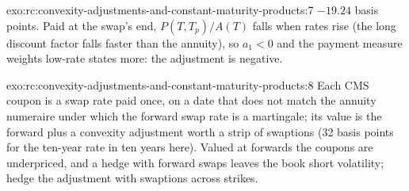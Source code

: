 \begin{solution}{exo:rc:convexity-adjustments-and-constant-maturity-products:7}
$-19.24$ basis points. Paid at the swap's end, $P(T,T_p)/A(T)$ falls when rates
rise (the long discount factor falls faster than the annuity), so $a_1<0$ and
the payment measure weights low-rate states more: the adjustment is negative.
\end{solution}

\begin{solution}{exo:rc:convexity-adjustments-and-constant-maturity-products:8}
Each CMS coupon is a swap rate paid once, on a date that does not match the
annuity numeraire under which the forward swap rate is a martingale; its value
is the forward plus a convexity adjustment worth a strip of swaptions (32
basis points for the ten-year rate in ten years here). Valued at forwards the
coupons are underpriced, and a hedge with forward swaps leaves the book short
volatility; hedge the adjustment with swaptions across strikes.
\end{solution}

